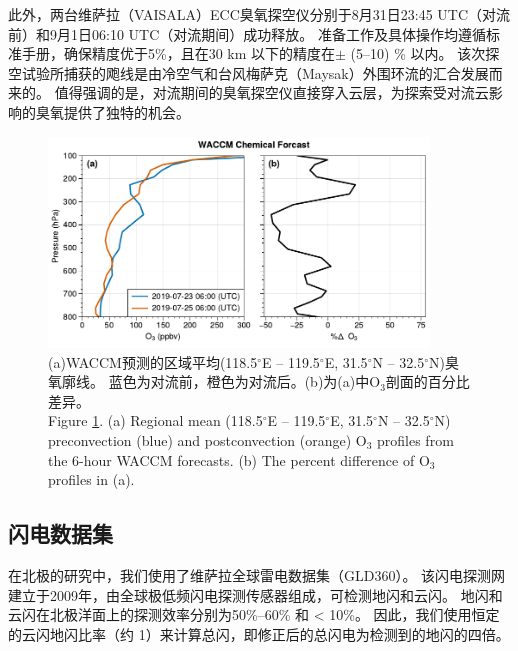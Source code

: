 此外，两台维萨拉（VAISALA）ECC臭氧探空仪分别于8月31日23:45 UTC（对流前）和9月1日06:10 UTC（对流期间）成功释放。
准备工作及具体操作均遵循标准手册，确保精度优于5\%，且在30 km 以下的精度在$\pm$ (5--10) \% 以内\citep{Smit.2007}。
该次探空试验所捕获的飑线是由冷空气和台风梅萨克（Maysak）外围环流的汇合发展而来的。
值得强调的是，对流期间的臭氧探空仪直接穿入云层，为探索受对流云影响的臭氧提供了独特的机会。



\begin{figure}[htbp]
\centering
\includegraphics[width=0.9\textwidth]{./figures/waccm_forcast_o3.pdf}
\caption{(a)WACCM预测的区域平均(118.5$^{\circ}$E -- 119.5$^{\circ}$E, 31.5$^{\circ}$N – 32.5$^{\circ}$N)臭氧廓线。
蓝色为对流前，橙色为对流后。(b)为(a)中O$_3$剖面的百分比差异。\\
Figure \ref{fig:waccm_forcast_o3}. (a) Regional mean (118.5$^{\circ}$E – 119.5$^{\circ}$E, 31.5$^{\circ}$N – 32.5$^{\circ}$N)
preconvection (blue) and postconvection (orange) O$_3$ profiles from the 6-hour WACCM forecasts.
(b) The percent difference of O$_3$ profiles in (a).
}
\label{fig:waccm_forcast_o3}
\end{figure}

\subsection{闪电数据集}

在北极的研究中，我们使用了维萨拉全球雷电数据集（GLD360）。
该闪电探测网建立于2009年，由全球极低频闪电探测传感器组成，可检测地闪和云闪\citep{Said.2010,Said.2013,Said.2017}。
地闪和云闪在北极洋面上的探测效率分别为50\%--60\% 和 < 10\%\citep{Vagasky.2022}。
因此，我们使用恒定的云闪地闪比率（约 1）来计算总闪，即修正后的总闪电为检测到的地闪的四倍\citep{Mackerras.1994,Prentice.1977}。

